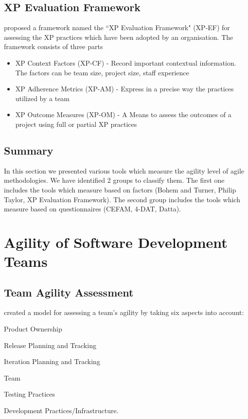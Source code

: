 \subsection{XP Evaluation Framework} %
\citet{williams2004toward} proposed a framework named the ``XP Evaluation Framework" (XP-EF) for assessing the XP practices which have been adopted by an organisation. The framework consists of three parts
\begin{itemize}
	\item XP Context Factors (XP-CF) - Record important contextual information. The factors can be team size, project size, staff experience
	\item XP Adherence Metrics (XP-AM) - Express in a precise way the practices utilized by a team
	\item XP Outcome Measures (XP-OM) - A Means to assess the outcomes of a project using full or partial XP practices
\end{itemize}

\subsection{Summary}
In this section we presented various tools which measure the agility level of agile methodologies. We have identified 2 groups to classify them. The first one includes the tools which measure based on factors (Bohem and Turner, Philip Taylor, XP Evaluation Framework). The second group includes the tools which measure based on questionnaires (CEFAM, 4-DAT, Datta).



\section{Agility of Software Development Teams}

\subsection{Team Agility Assessment} %
\citet{Leffingwell} created a model for assessing a team's agility by
 taking six aspects into account:
\begin{inparaenum} [a\upshape)]
\item Product Ownership
\item Release Planning and Tracking
\item Iteration Planning and Tracking
\item Team
\item Testing Practices
\item Development Practices/Infrastructure.
\end{inparaenum}

